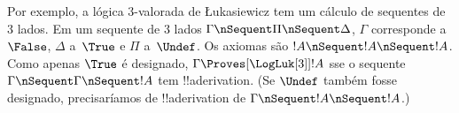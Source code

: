 \documentclass[../../../include/open-logic-section]{subfiles}
\begin{document}
Por exemplo, a lógica $3$-valorada de \L ukasiewicz tem um cálculo de
sequentes de $3$ lados. Em um sequente de $3$ lados $\Gamma \nSequent
\Pi \nSequent \Delta$, $\Gamma$ corresponde a~$\False$, $\Delta$
a~$\True$ e $\Pi$ a~$\Undef$. Os axiomas são $!A \nSequent !A
\nSequent !A$. Como apenas $\True$ é designado, $\Gamma
\Proves[\LogLuk[3]] !A$ sse o sequente $\Gamma \nSequent \Gamma
\nSequent !A$ tem !!a{derivation}. (Se $\Undef$ também fosse designado,
precisaríamos de !!a{derivation} de $\Gamma \nSequent !A \nSequent !A$.)
\end{document}
